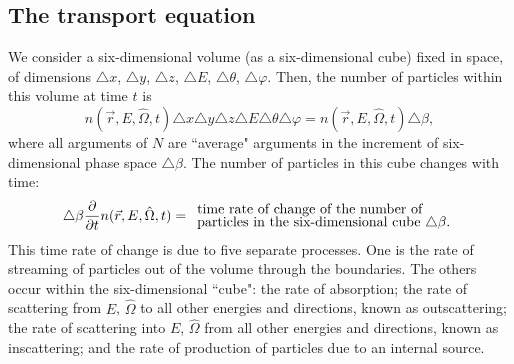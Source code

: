 \documentclass[12pt]{article}
\newcommand{\rvec}{\ensuremath{\vec{r}}}
\newcommand{\omvec}{\ensuremath{\hat{\Omega}}}
\begin{document}
\subsection*{The transport equation}
We consider a six-dimensional volume (as a six-dimensional cube)
 fixed in space, of dimensions
$\triangle x$, $\triangle y$, $\triangle z$, $\triangle E$, $\triangle \theta$, $\triangle \varphi$.
Then, the number of particles within this volume at time $t$ is
\begin{equation*}
n(\rvec,E,\omvec,t)\triangle x\triangle y\triangle z\triangle E\triangle \theta\triangle \varphi =
n(\rvec,E,\omvec,t)\triangle \beta,
\end{equation*}
where all arguments of $N$ are ``average" arguments in the %
increment of six-dimensional phase space $\triangle \beta$.
The number of
particles in this cube changes with time:
\begin{equation*}
\triangle \beta\frac{\partial}{\partial t}n(\rvec,E,\omvec,t) = \begin{array}{l}
\text{time rate of change of the number of}\vspace{-0.1cm}\\
\text{particles in the six-dimensional cube $\triangle \beta$.}
\end{array}
\end{equation*}
 This time rate of change is due to five separate processes. One is the rate of streaming of
particles out of the volume through the boundaries. The others occur within the
six-dimensional ``cube": the rate
of absorption; the rate of scattering from $E$, $\omvec$ to all other energies and directions, known
as outscattering; the rate of scattering into $E$, $\omvec$ from all other energies and
 directions, known as inscattering; and the rate of production of particles due to an internal source.
\end{document}
